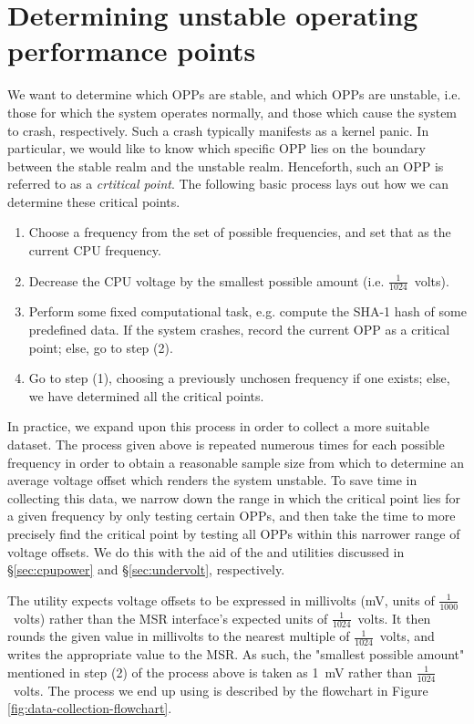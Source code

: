 \section{Determining unstable operating performance points}
\label{sec:unstableOPPs}

We want to determine which OPPs are stable, and which OPPs are unstable, i.e.
those for which the system operates normally, and those which cause the system
to crash, respectively. Such a crash typically manifests as a kernel panic.
In particular, we would like to know which specific OPP lies on the boundary
between the stable realm and the unstable realm. Henceforth, such an OPP is
referred to as a \emph{crtitical point}. The following basic process lays out
how we can determine these critical points.

\begin{enumerate}
    \item Choose a frequency from the set of possible frequencies, and set that
        as the current CPU frequency.
    \item Decrease the CPU voltage by the smallest possible amount
        (i.e. $\frac{1}{1024}$~volts).
    \item Perform some fixed computational task, e.g. compute the SHA-1 hash of
        some predefined data. If the system crashes, record the current
        OPP as a critical point; else, go to step (2).
    \item Go to step (1), choosing a previously unchosen frequency if one
        exists; else, we have determined all the critical points.
\end{enumerate}

In practice, we expand upon this process in order to collect a more suitable
dataset. The process given above is repeated numerous times for each possible
frequency in order to obtain a reasonable sample size from which to determine
an average voltage offset which renders the system unstable. To save time in
collecting this data, we narrow down the range in which the critical point lies
for a given frequency by only testing certain OPPs, and then take the time to
more precisely find the critical point by testing all OPPs within this narrower
range of voltage offsets. We do this with the aid of the  and
 utilities discussed in §\ref{sec:cpupower} and
§\ref{sec:undervolt}, respectively.

The  utility expects voltage offsets to be expressed in
millivolts (mV, units of $\frac{1}{1000}$~volts) rather than the MSR interface's
expected units of $\frac{1}{1024}$~volts. It then rounds the given value in
millivolts to the nearest multiple of $\frac{1}{1024}$~volts, and writes the
appropriate value to the MSR. As such, the "smallest possible amount" mentioned
in step (2) of the process above is taken as 1~mV rather than
$\frac{1}{1024}$~volts. The process we end up using is described by the
flowchart in Figure \ref{fig:data-collection-flowchart}.

